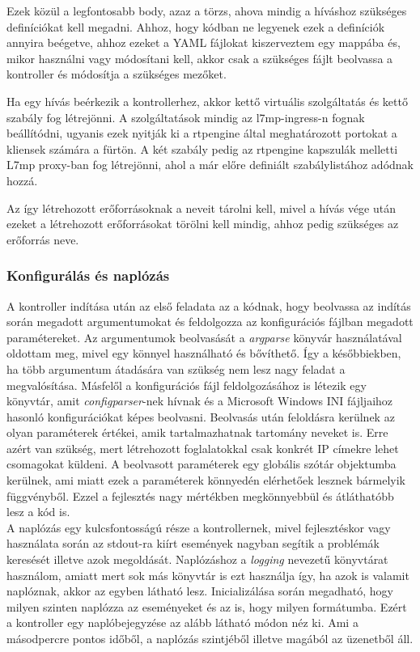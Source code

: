 Ezek közül a legfontosabb body, azaz a törzs, ahova mindig a híváshoz szükséges definíciókat
kell megadni. Ahhoz, hogy kódban ne legyenek ezek a definíciók annyira beégetve, ahhoz
ezeket a YAML fájlokat kiszerveztem egy mappába és, mikor használni vagy módosítani kell,
akkor csak a szükséges fájlt beolvassa a kontroller és módosítja a szükséges mezőket.

Ha egy hívás beérkezik a kontrollerhez, akkor kettő virtuális szolgáltatás és kettő
szabály fog létrejönni. A szolgáltatások mindig az l7mp-ingress-n fognak beállítódni, 
ugyanis ezek nyitják ki a rtpengine által meghatározott portokat a kliensek számára
a fürtön. A két szabály pedig az rtpengine kapszulák melletti L7mp proxy-ban 
fog létrejönni, ahol a már előre definiált szabálylistához adódnak hozzá. 

Az így létrehozott erőforrásoknak a neveit tárolni kell, mivel a hívás vége után ezeket
a létrehozott erőforrásokat törölni kell mindig, ahhoz pedig szükséges az erőforrás 
neve. 

\subsubsection{Konfigurálás és naplózás}

A kontroller indítása után az első feladata az a kódnak, hogy beolvassa az indítás
során megadott argumentumokat és feldolgozza az konfigurációs fájlban megadott 
paramétereket. Az argumentumok beolvasását a \textit{argparse} \cite{argparse} könyvár használatával
oldottam meg, mivel egy könnyel használható és bővíthető. Így a későbbiekben, ha 
több argumentum átadására van szükség nem lesz nagy feladat a megvalósítása. Másfelől
a konfigurációs fájl feldolgozásához is létezik egy könyvtár, amit \textit{configparser}-nek \cite{configparser}
hívnak és a Microsoft Windows INI fájljaihoz hasonló konfigurációkat képes beolvasni. Beolvasás
után feloldásra kerülnek az olyan paraméterek értékei, amik tartalmazhatnak tartomány neveket
is. Erre azért van szükség, mert létrehozott foglalatokkal csak konkrét IP címekre lehet 
csomagokat küldeni. A beolvasott paraméterek egy globális szótár objektumba kerülnek, ami 
miatt ezek a paraméterek könnyedén elérhetőek lesznek bármelyik függvényből. Ezzel a fejlesztés
nagy mértékben megkönnyebbül és átláthatóbb lesz a kód is. \\

A naplózás egy kulcsfontosságú része a kontrollernek, mivel fejlesztéskor vagy használata
során az stdout-ra kiírt események nagyban segítik a problémák keresését illetve azok 
megoldását. Naplózáshoz a \textit{logging} \cite{logging} nevezetű könyvtárat használom, amiatt mert 
sok más könyvtár is ezt használja így, ha azok is valamit naplóznak, akkor az egyben 
látható lesz. Inicializálása során megadható, hogy milyen szinten naplózza az eseményeket 
és az is, hogy milyen formátumba. Ezért a kontroller egy naplóbejegyzése az alább látható 
módon néz ki. Ami a másodpercre pontos időből, a naplózás szintjéből illetve magából az 
üzenetből áll.

